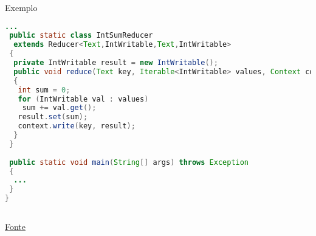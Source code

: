 \begin{frame}[fragile]{Exemplo}
\begin{lstlisting}[language=java]
...
 public static class IntSumReducer 
  extends Reducer<Text,IntWritable,Text,IntWritable> 
 { 
  private IntWritable result = new IntWritable();
  public void reduce(Text key, Iterable<IntWritable> values, Context context) throws IOException, InterruptedException 
  {
   int sum = 0;
   for (IntWritable val : values) 
    sum += val.get();
   result.set(sum);
   context.write(key, result);
  }
 }
	
 public static void main(String[] args) throws Exception 
 {
  ...
 }
}
	
\end{lstlisting}
\href{https://hadoop.apache.org/docs/current/hadoop-mapreduce-client/hadoop-mapreduce-client-core/MapReduceTutorial.html#Example:_WordCount_v1.0}{Fonte}
\end{frame}





